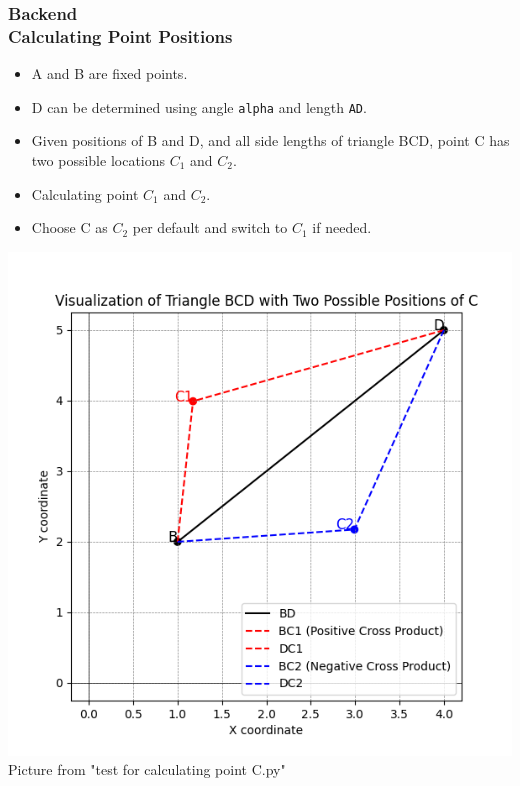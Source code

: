 \documentclass[ucs,10pt]{beamer}
\begin{document}
\begin{frame}
    \frametitle{Backend \\ \small \color{rwth-blue} Calculating Point Positions}
    \begin{minipage}{0.48\linewidth} %
        \begin{itemize}
            \item A and B are fixed points.
            \item D can be determined using angle \texttt{alpha} and length \texttt{AD}.
            \item Given positions of B and D, and all side lengths of triangle BCD, point C has two possible locations $C_1$ and $C_2$.
            \item Calculating point $C_1$ and $C_2$.
            \item Choose C as $C_2$ per default and switch to $C_1$ if needed.
        \end{itemize}
    \end{minipage}
    \hspace{0.02\linewidth} %
    \begin{minipage}{0.48\linewidth} %
        \begin{center}
            \includegraphics[width=\linewidth]{./Figures/test_for_calculating_point_C.png}
            \vspace{0.5em}
            {\tiny Picture from "test for calculating point C.py"}
        \end{center}
    \end{minipage}
\end{frame}
\end{document}
